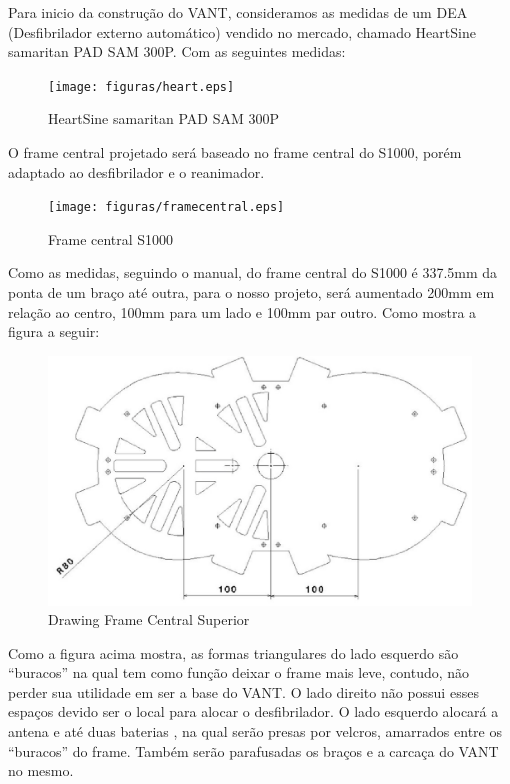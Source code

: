 Para inicio da construção do VANT, consideramos as medidas de um DEA (Desfibrilador externo automático) vendido no mercado, chamado HeartSine samaritan PAD SAM 300P. Com as seguintes  medidas:

\begin{figure}[h!]
    \centering
      \texttt{[image: figuras/heart.eps]}
    \caption{ HeartSine samaritan PAD SAM 300P}
    \label{fig:heart}
\end{figure}

O frame central projetado será baseado no frame central do S1000, porém adaptado ao desfibrilador e o reanimador. 

\begin{figure}[h!]
    \centering
      \texttt{[image: figuras/framecentral.eps]}
    \caption{ Frame central S1000}
    \label{fig:framecentral}
\end{figure}


Como as medidas, seguindo o manual, do frame central do S1000 é 337.5mm da ponta de um braço até outra, para o nosso projeto, será aumentado  200mm em relação ao centro, 100mm para um lado e 100mm par outro. Como mostra a figura a seguir:

\begin{figure}[h!]
    \centering
      \includegraphics[keepaspectratio=true,scale=0.5]{figuras/drawing.eps}
    \caption{ Drawing Frame Central Superior}
    \label{fig:drawing}
\end{figure}

Como a figura acima mostra, as formas triangulares do lado esquerdo são “buracos” na qual tem como função deixar o frame mais leve, contudo, não perder sua utilidade em ser a base do VANT. O lado direito não possui esses espaços devido ser o local para alocar o desfibrilador. O lado esquerdo alocará a antena e até duas baterias , na qual serão presas por velcros, amarrados entre os “buracos” do frame. Também serão parafusadas os braços e a carcaça do VANT no mesmo.

